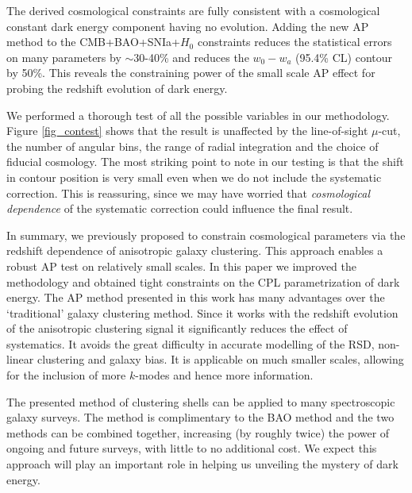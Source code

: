 \documentclass{natureprintstyle}
\begin{document}
The derived cosmological constraints are fully consistent with a cosmological constant dark energy component having no evolution.
Adding the new AP method to the CMB+BAO+SNIa+$H_0$ constraints reduces the statistical errors on many parameters by $\sim$30-40\% 
and reduces the $w_0-w_a$ (95.4\% CL) contour by 50\%.
This reveals the constraining power of the small scale AP effect for probing the redshift evolution of dark energy.

We performed a thorough test of all the possible variables in our methodology.
Figure \ref{fig_contest} shows that 
the result is unaffected by the line-of-sight $\mu$-cut, 
the number of angular bins, 
the range of radial integration and the choice of fiducial cosmology. 
The most striking point to note in our testing is that the 
shift in contour position is very small even when we do not include the systematic correction.
This is reassuring, since we may have worried that {\it cosmological dependence} 
of the systematic correction could influence the final result. 

In summary, we previously proposed to constrain cosmological parameters via 
the redshift dependence of anisotropic galaxy clustering\cite{Li2016}.
This approach enables a robust AP test on relatively small scales.
In this paper we improved the methodology and obtained tight constraints on the CPL parametrization of dark energy.
The AP method presented in this work has many advantages over the `traditional' galaxy clustering method.
Since it works with the redshift evolution of the anisotropic clustering signal it significantly reduces the effect of systematics. 
It avoids the great difficulty in accurate modelling of the RSD, non-linear clustering and galaxy bias.
It is applicable on much smaller scales, allowing for the inclusion of more $k$-modes and hence more information. 

The presented method of clustering shells can be applied to many spectroscopic galaxy surveys. 
The method is complimentary to the BAO method and the two methods can be combined together, 
increasing (by roughly twice) the power of ongoing and future surveys, with little to no additional cost.
We expect this approach will play an important role in helping us unveiling the mystery of dark energy.
\end{document}
